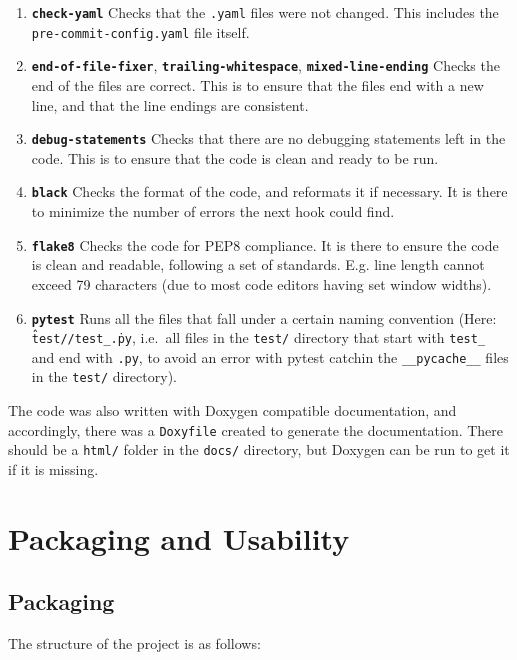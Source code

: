 \documentclass[12pt]{report} %
\begin{document}
\begin{enumerate}
  \item \textbf{\texttt{check-yaml}} Checks that the \texttt{.yaml} files were not changed. This includes the \texttt{pre-commit-config.yaml} file itself.
  \item \textbf{\texttt{end-of-file-fixer}}, \textbf{\texttt{trailing-whitespace}}, \textbf{\texttt{mixed-line-ending}} Checks the end of the files are correct. This is to ensure that the files end with a new line, and that the line endings are consistent.
  \item \textbf{\texttt{debug-statements}} Checks that there are no debugging statements left in the code. This is to ensure that the code is clean and ready to be run.
  \item \textbf{\texttt{black}} Checks the format of the code, and reformats it if necessary. It is there to minimize the number of errors the next hook could find.
  \item \textbf{\texttt{flake8}} Checks the code for PEP8 compliance. It is there to ensure the code is clean and readable, following a set of standards. E.g. line length cannot exceed 79 characters (due to most code editors having set window widths\cite{pep8_}).
  \item \textbf{\texttt{pytest}} Runs all the files that fall under a certain naming convention (Here: \texttt{\^test//test\_.\*\.py}, i.e.\ all files in the \texttt{test/} directory that start with \texttt{test\_} and end with \texttt{.py}, to avoid an error with pytest catchin the \texttt{\_\_pycache\_\_} files in the \texttt{test/} directory).
\end{enumerate}

The code was also written with Doxygen compatible documentation, and accordingly, there was a \texttt{Doxyfile} created to generate the documentation. There should be a \texttt{html/} folder in the \texttt{docs/} directory, but Doxygen can be run to get it if it is missing.


\chapter{Packaging and Usability}

\section{Packaging}

The structure of the project is as follows:
\end{document}
